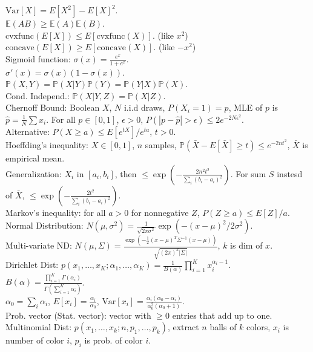 $\text{Var}[X] = E[X^2] - E[X]^2$.\\
$\mathbb{E}(AB) \geq \mathbb{E}(A)\mathbb{E}(B)$.\\
$\text{cvxfunc}(E[X]) \leq E[\text{cvxfunc}(X)]$. (like $x^2$)\\
$\text{concave}(E[X]) \geq E[\text{concave}(X)]$. (like $-x^2$)\\
Sigmoid function: $\sigma(x) = \frac{e^x}{1+e^x}$.\\
$\sigma'(x) = \sigma(x)(1-\sigma(x))$.\\
$\mathbb{P}(X, Y) = \mathbb{P}(X|Y)\mathbb{P}(Y) = \mathbb{P}(Y|X)\mathbb{P}(X)$.\\
Cond. Independ.: $\mathbb{P}(X|Y, Z) = \mathbb{P}(X|Z)$.\\
Chernoff Bound: Boolean $X$, $N$ i.i.d draws, $P(X_i=1)=p$, MLE of $p$ is $\hat{p}=\frac{1}{N}\sum x_i$. For all $p \in [0, 1]$, $\epsilon > 0$, $P(|p-\hat{p}| > \epsilon) \leq 2e^{-2N\epsilon^2}$.\\
Alternative: $P(X \geq a) \leq E[e^{tX}]/e^{ta}$, $t>0$.\\
Hoeffding's inequality: $X \in [0, 1]$, $n$ samples, $\mathbb{P}(\bar{X} - E[\bar{X}] \geq t) \leq e^{-2nt^2}$, $\bar{X}$ is empirical mean.\\
Generalization: $X_i$ in $[a_i, b_i]$, then $\leq \exp(-\frac{2n^2 t^2}{\sum_i (b_i-a_i)^2})$. For sum $S$ instesd of $\bar{X}$, $\leq \exp(-\frac{2 t^2}{\sum_i (b_i-a_i)^2})$.\\
Markov's inequality: for all $a > 0$ for nonnegative $Z$, $P(Z \geq a) \leq E[Z]/a$.\\
Normal Distribution: $N(\mu, \sigma^2) = \frac{1}{\sqrt{2 \pi \sigma^2}}\exp(-(x-\mu)^2/2\sigma^2)$.\\
Multi-variate ND: $N(\mu, \Sigma) = \frac{\exp(-\frac{1}{2}(x-\mu)^T\Sigma^{-1}(x-\mu))}{\sqrt{(2\pi)^k |\Sigma|}}$, $k$ is dim of $x$.\\
Dirichlet Dist: $p(x_1, \dots, x_K; \alpha_1, \dots, \alpha_K)=\frac{1}{B(\alpha)}\prod_{i=1}^K x_i^{\alpha_i - 1}$.\\
$B(\alpha) = \frac{\prod_{i=1}^K\Gamma(\alpha_i)}{\Gamma(\sum_{i=1}^K\alpha_i)}$.\\
$\alpha_0 = \sum_i \alpha_i$, $E[x_i]= \frac{\alpha_i}{\alpha_0}$, $\text{Var}[x_i] = \frac{\alpha_i(\alpha_0-\alpha_i)}{\alpha_0^2(\alpha_0+1)}$.\\
Prob. vector (Stat. vector): vector with $\geq 0$ entries that add up to one.\\
Multinomial Dist: $p(x_1, \dots, x_k; n, p_1, \dots, p_k)$, extract $n$ balls of $k$ colors, $x_i$ is number of color $i$, $p_i$ is prob. of color $i$.

